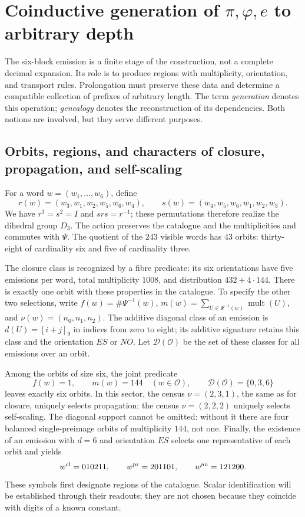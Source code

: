 \section{Coinductive generation of \texorpdfstring{\(\pi,\varphi,e\)}{pi, phi, e} to arbitrary depth}
\label{sec:generacion}

The six-block emission is a finite stage of the construction, not a complete decimal expansion. Its role is to produce regions with multiplicity, orientation, and transport rules. Prolongation must preserve these data and determine a compatible collection of prefixes of arbitrary length. The term \emph{generation} denotes this operation; \emph{genealogy} denotes the reconstruction of its dependencies. Both notions are involved, but they serve different purposes.

\subsection{Orbits, regions, and characters of closure, propagation, and self-scaling}

For a word \(w=(w_1,\ldots,w_6)\), define
\[
 r(w)=(w_3,w_1,w_2,w_5,w_6,w_4),\qquad
 s(w)=(w_4,w_5,w_6,w_1,w_2,w_3).
\]
We have \(r^3=s^2=I\) and \(srs=r^{-1}\); these permutations therefore realize the dihedral group \(D_3\). The action preserves the catalogue and the multiplicities and commutes with \(\Psi\). The quotient of the \(243\) visible words has \(43\) orbits: thirty-eight of cardinality six and five of cardinality three.

The closure class is recognized by a fibre predicate: its six orientations have five emissions per word, total multiplicity \(1008\), and distribution \(432+4\cdot144\). There is exactly one orbit with these properties in the catalogue. To specify the other two selections, write \(f(w)=\#\Psi^{-1}(w)\), \(m(w)=\sum_{U\in\Psi^{-1}(w)}\operatorname{mult}(U)\), and \(\nu(w)=(n_0,n_1,n_2)\). The additive diagonal class of an emission is \(d(U)=[i+j]_9\) in indices from zero to eight; its additive signature retains this class and the orientation \(ES\) or \(NO\). Let \(\mathcal D(\mathcal O)\) be the set of these classes for all emissions over an orbit.

Among the orbits of size six, the joint predicate
\[
 f(w)=1,\qquad m(w)=144\quad(w\in\mathcal O),\qquad
 \mathcal D(\mathcal O)=\{0,3,6\}
\]
leaves exactly six orbits. In this sector, the census \(\nu=(2,3,1)\), the same as for closure, uniquely selects propagation; the census \(\nu=(2,2,2)\) uniquely selects self-scaling. The diagonal support cannot be omitted: without it there are four balanced single-preimage orbits of multiplicity \(144\), not one. Finally, the existence of an emission with \(d=6\) and orientation \(ES\) selects one representative of each orbit and yields
\begin{equation}
 w^{\rm cl}=010211,\qquad w^{\rm pr}=201101,\qquad w^{\rm au}=121200.
 \label{eq:palabras-regionales}
\end{equation}
These symbols first designate regions of the catalogue. Scalar identification will be established through their readouts; they are not chosen because they coincide with digits of a known constant.


